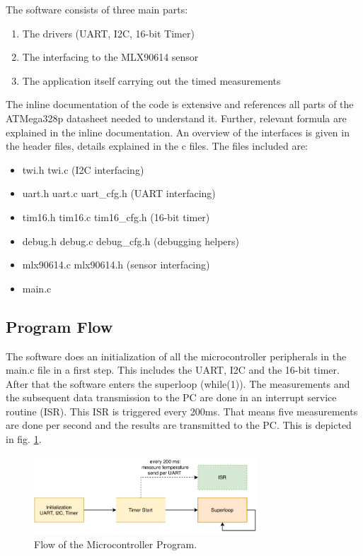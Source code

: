 \documentclass{article}[12pt]
\begin{document}
The software consists of three main parts: 

\begin{enumerate}
	\item The drivers (UART, I2C, 16-bit Timer)
	\item The interfacing to the MLX90614 sensor
	\item The application itself carrying out the timed measurements
\end{enumerate}

The inline documentation of the code is extensive and references all parts of the ATMega328p datasheet needed to understand it. Further, relevant formula are explained in the inline documentation. An overview of the interfaces is given in the header files, details explained in the c files. The files included are:

\begin{itemize}
	\item twi.h twi.c (I2C interfacing)
	\item uart.h uart.c uart\_cfg.h (UART interfacing)
	\item tim16.h tim16.c tim16\_cfg.h (16-bit timer)
	\item debug.h debug.c debug\_cfg.h (debugging helpers)
	\item mlx90614.c mlx90614.h (sensor interfacing)
	\item main.c 
\end{itemize}

\subsection{Program Flow}

The software does an initialization of all the microcontroller peripherals in the main.c file in a first step. This includes the UART, I2C and the 16-bit timer. After that the software enters the superloop (while(1)). The measurements and the subsequent data transmission to the PC are done in an interrupt service routine (ISR). This ISR is triggered every 200ms. That means five measurements are done per second and the results are transmitted to the PC. This is depicted in fig. \ref{fig:swflow}.


\begin{figure}[H]
  \caption{Flow of the Microcontroller Program.}
  \label{fig:swflow}
  \centering
    \includegraphics[width=0.75\textwidth]{img/swflow.pdf}
\end{figure}
\end{document}

